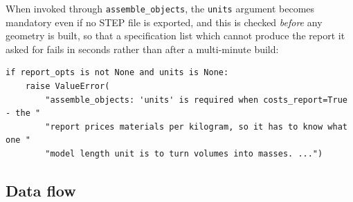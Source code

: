 \documentclass[9pt,a4paper]{extarticle}
\newcommand{\code}[1]{\texttt{\small #1}}
\begin{document}
When invoked through \code{assemble\_objects}, the \code{units} argument becomes
mandatory even if no STEP file is exported, and this is checked \emph{before}
any geometry is built, so that a specification list which cannot produce the
report it asked for fails in seconds rather than after a multi-minute build:

\begin{lstlisting}[style=py]
if report_opts is not None and units is None:
    raise ValueError(
        "assemble_objects: 'units' is required when costs_report=True - the "
        "report prices materials per kilogram, so it has to know what one "
        "model length unit is to turn volumes into masses. ...")
\end{lstlisting}

\subsection{Data flow}
\end{document}
